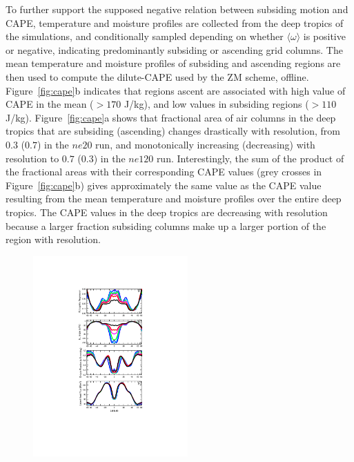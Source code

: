 To further support the supposed negative relation between subsiding motion and CAPE, temperature and moisture profiles are collected from the deep tropics of the simulations, and conditionally sampled depending on whether $\langle \omega \rangle$ is positive or negative, indicating predominantly subsiding or ascending grid columns. The mean temperature and moisture profiles of subsiding and ascending regions are then used to compute the dilute-CAPE used by the ZM scheme, offline. Figure~\ref{fig:cape}b indicates that regions ascent are associated with high value of CAPE in the mean ($>170$ J/kg), and low values in subsiding regions ($>110$ J/kg). Figure~\ref{fig:cape}a shows that fractional area of air columns in the deep tropics that are subsiding (ascending) changes drastically with resolution, from $0.3$ ($0.7$) in the $ne20$ run, and monotonically increasing (decreasing) with resolution to $0.7$ ($0.3$) in the $ne120$ run. Interestingly, the sum of the product of the fractional areas with their corresponding CAPE values (grey crosses in Figure~\ref{fig:cape}b) gives approximately the same value as the CAPE value resulting from the mean temperature and moisture profiles over the entire deep tropics. The CAPE values in the deep tropics are decreasing with resolution because a larger fraction subsiding columns make up a larger portion of the region with resolution.

\begin{figure}[t]
\begin{center}
\noindent\includegraphics[width=14pc,angle=0]{chapter6/temp_zonal_4reg_dwn.pdf}\\
\end{center}
\caption{}
\label{fig:4reg}
\end{figure}

